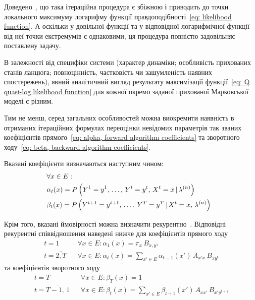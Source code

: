 Доведено~\cite[розділ 4]{Koski2001}, що така ітераційна процедура є збіжною і приводить до точки локального максимуму логарифму функції правдоподібності~\eqref{eq: likelihood function}. А оскільки у довільної функції та у відповідної логарифмічної функції від неї точки екстремумів є однаковими, ця процедура повністю задовільняє поставлену задачу.

В залежності від специфіки системи (характер динаміки; особливість прихованих станів ланцюга; повноцінність, частковість чи зашумленість наявних спостережень), явний аналітичний вигляд результату максимізації функції~\eqref{eq: Q quasi-log likelihood function} для кожної окремо заданої прихованої Марковської моделі є різним.

Тим не менш, серед загальних особливостей можна виокремити наявність в отриманих ітераційних формулах переоцінки невідомих параметрів так званих коефіцієнтів прямого~\eqref{eq: alpha, forward algorithm coefficients} та зворотного ходу~\eqref{eq: beta, backward algorithm coefficients}.

Вказані коефіцієнти визначаються наступним чином:
\begin{align}
    & \forall x \in E: \notag \\
    & \alpha_t(x) = P\left( Y^1=y^1,\,\ldots,\,Y^t=y^t,\,X^t=x \,|\, \lambda^{(n)} \right) \label{eq: alpha, forward algorithm coefficients} \\
    & \beta_t(x) = P\left( Y^{t+1}=y^{t+1},\,\ldots,\,Y^T=y^T \,|\, X^t=x,\, \lambda^{(n)} \right) \label{eq: beta, backward algorithm coefficients}
\end{align}

Крім того, вказані ймовірності можна визначити рекурентно~\cite[розділ 5]{Nilsson2005}. Відповідні рекурентні співвідношення наведені нижче для коефіцієнтів прямого ходу
\begin{align*}
    & t = 1              && \forall x \in E: \alpha_1(x)=\pi_{x}\,B_{x,y^1} \\
    & t = \overline{2,T} && \forall x \in E: \alpha_{t}(x)=\sum\limits_{x'\in E}\alpha_{t-1}(x')\,A_{x'x}\,B_{xy^{t}} 
\end{align*}
та коефіцієнтів зворотного ходу
\begin{align*}
    & t = T                && \forall x \in E: \beta_T(x)=1 \\
    & t = \overline{T-1,\,1} && \forall x \in E: \beta_t(x)=\sum\limits_{x' \in E}\beta_{t+1}(x')\,A_{x x'}\,B_{x'y^{t+1}}
\end{align*}

